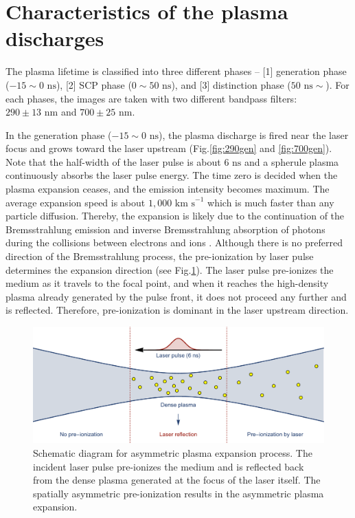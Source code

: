 \section{Characteristics of the plasma discharges}
\label{sec:ch4-2}

The plasma lifetime is classified into three different phases -- [1] generation phase ($-15 \sim 0 \text{ ns}$), [2] SCP phase ($0 \sim 50 \text{ ns}$), and [3] distinction phase ($50 \text{ ns} \sim$). For each phases, the images are taken with two different bandpass filters: $290\pm13 \text{ nm}$ and $700\pm25 \text{ nm}$.

In the generation phase ($-15 \sim 0 \text{ ns}$), the plasma discharge is fired near the laser focus and grows toward the laser upstream (Fig.\ref{fig:290gen} and \ref{fig:700gen}). Note that the half-width of the laser pulse is about $6 \text{ ns}$ and a spherule plasma continuously absorbs the laser pulse energy. The time zero is decided when the plasma expansion ceases, and the emission intensity becomes maximum. The average expansion speed is about $1,000 \text{ km s}^{-1}$ which is much faster than any particle diffusion. Thereby, the expansion is likely due to the continuation of the Bremsstrahlung emission and inverse Bremsstrahlung absorption of photons during the collisions between electrons and ions \cite{bataller2016observation}. Although there is no preferred direction of the Bremsstrahlung process, the pre-ionization by laser pulse determines the expansion direction (see Fig.\ref{fig:ionizationWave}). The laser pulse pre-ionizes the medium as it travels to the focal point, and when it reaches the high-density plasma already generated by the pulse front, it does not proceed any further and is reflected. Therefore, pre-ionization is dominant in the laser upstream direction.

\begin{figure}[ht!]
\centering
\includegraphics[width=130mm]{figures/ch4/ionization/ionizationWave.pdf}
\caption{Schematic diagram for asymmetric plasma expansion process. The incident laser pulse pre-ionizes the medium and is reflected back from the dense plasma generated at the focus of the laser itself. The spatially asymmetric pre-ionization results in the asymmetric plasma expansion.}
\label{fig:ionizationWave}
\end{figure}

